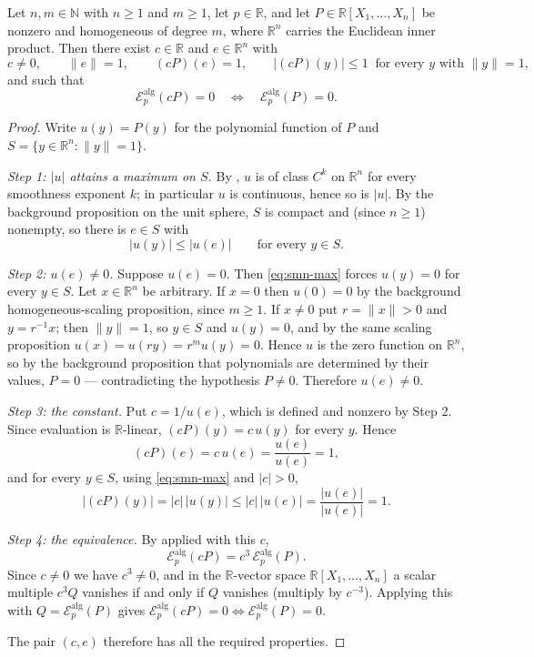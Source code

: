 \begin{lemma}
Let $n,m\in\mathbb{N}$ with $n\ge1$ and $m\ge1$, let $p\in\mathbb{R}$, and let
$P\in\mathbb{R}[X_1,\dots,X_n]$ be nonzero and homogeneous of degree $m$, where
$\mathbb{R}^n$ carries the Euclidean inner product. Then there exist
$c\in\mathbb{R}$ and $e\in\mathbb{R}^n$ with
\[
  c\ne0,\qquad \lVert e\rVert=1,\qquad (cP)(e)=1,\qquad
  \lvert (cP)(y)\rvert\le1\ \text{ for every }y\text{ with }\lVert y\rVert=1,
\]
and such that
\[
  \mathcal{E}^{\mathrm{alg}}_p(cP)=0
  \quad\Longleftrightarrow\quad
  \mathcal{E}^{\mathrm{alg}}_p(P)=0 .
\]
\end{lemma}
\begin{proof}
Write $u(y)=P(y)$ for the polynomial function of $P$ and
$S=\{y\in\mathbb{R}^n:\lVert y\rVert=1\}$.

\emph{Step 1: $\lvert u\rvert$ attains a maximum on $S$.} By
, $u$ is of class $C^k$ on $\mathbb{R}^n$ for every
smoothness exponent $k$; in particular $u$ is continuous, hence so is
$\lvert u\rvert$. By the background proposition on the unit sphere, $S$ is
compact and (since $n\ge1$) nonempty, so there is $e\in S$ with
\begin{equation}\label{eq:smn-max}
  \lvert u(y)\rvert\le\lvert u(e)\rvert\qquad\text{for every }y\in S .
\end{equation}

\emph{Step 2: $u(e)\ne0$.} Suppose $u(e)=0$. Then \eqref{eq:smn-max} forces
$u(y)=0$ for every $y\in S$. Let $x\in\mathbb{R}^n$ be arbitrary. If $x=0$ then
$u(0)=0$ by the background homogeneous-scaling proposition, since $m\ge1$. If
$x\ne0$ put $r=\lVert x\rVert>0$ and $y=r^{-1}x$; then $\lVert y\rVert=1$, so
$y\in S$ and $u(y)=0$, and by the same scaling proposition
$u(x)=u(ry)=r^{m}u(y)=0$. Hence $u$ is the zero function on $\mathbb{R}^n$, so
by the background proposition that polynomials are determined by their values,
$P=0$ --- contradicting the hypothesis $P\ne0$. Therefore $u(e)\ne0$.

\emph{Step 3: the constant.} Put $c=1/u(e)$, which is defined and nonzero by
Step 2. Since evaluation is $\mathbb{R}$-linear, $(cP)(y)=c\,u(y)$ for every
$y$. Hence
\[
  (cP)(e)=c\,u(e)=\frac{u(e)}{u(e)}=1,
\]
and for every $y\in S$, using \eqref{eq:smn-max} and $\lvert c\rvert>0$,
\[
  \lvert (cP)(y)\rvert=\lvert c\rvert\,\lvert u(y)\rvert
  \le\lvert c\rvert\,\lvert u(e)\rvert
  =\frac{\lvert u(e)\rvert}{\lvert u(e)\rvert}=1 .
\]

\emph{Step 4: the equivalence.} By  applied with this $c$,
\[
  \mathcal{E}^{\mathrm{alg}}_p(cP)=c^3\,\mathcal{E}^{\mathrm{alg}}_p(P).
\]
Since $c\ne0$ we have $c^3\ne0$, and in the $\mathbb{R}$-vector space
$\mathbb{R}[X_1,\dots,X_n]$ a scalar multiple $c^3Q$ vanishes if and only if
$Q$ vanishes (multiply by $c^{-3}$). Applying this with
$Q=\mathcal{E}^{\mathrm{alg}}_p(P)$ gives
$\mathcal{E}^{\mathrm{alg}}_p(cP)=0\iff\mathcal{E}^{\mathrm{alg}}_p(P)=0$.

The pair $(c,e)$ therefore has all the required properties.
\end{proof}
